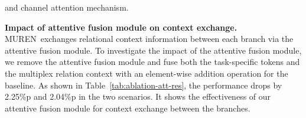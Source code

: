 \documentclass[10pt,twocolumn,letterpaper]{article}
\begin{document}
\begin{table}[]
\begin{center}
\end{center}
\vspace{-0.4cm}
\caption{The impact of the multiplex relation context on each sub-task. The `human', `object', and `interaction' columns indicate the propagation of the multiplex relation context to human, object, and interaction branch, respectively.}
\vspace{-2mm}
\label{tab:ablation-message-res}
\end{table}

\begin{table}[]
\begin{center}
\end{center}
\vspace{-0.4cm}
\caption{Ablations studies on each component in the attentive fusion module. `conditioning` and `channel` indicate transforming multiplex relation context conditioned on a task-specific token} and channel attention mechanism.
\label{tab:ablation-att-res}
\vspace{-0.6cm}
\end{table}

\noindent
\textbf{Impact of attentive fusion module on context exchange.}
MUREN~exchanges relational context information between each branch via the attentive fusion module.
To investigate the impact of the attentive fusion module, we remove the attentive fusion module and fuse both the task-specific tokens and the multiplex relation context with an element-wise addition operation for the baseline.
As shown in Table~\ref{tab:ablation-att-res}, the performance drops by 2.25\%p and 2.04\%p in the two scenarios.
It shows the effectiveness of our attentive fusion module for context exchange between the branches.
\end{document}
